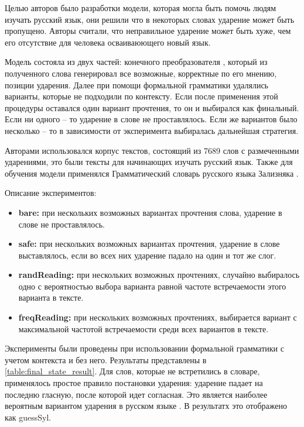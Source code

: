 \documentclass[14pt, a4paper, russian]{report}
\begin{document}
\begin{normalsize}
Целью авторов\cite{reynolds} было разработки модели, которая могла быть помочь людям изучать русский язык, они решили что в некоторых словах ударение может быть пропущено. Авторы считали, что неправильное ударение может быть хуже, чем его отсутствие для человека осваиваюющего новый язык.

Модель состояла из двух частей: конечного преобразователя \cite{koskenniemi, karttunen}, который из полученного слова генерировал все возможные, корректные по его мнению, позиции ударения. Далее при помощи формальной грамматики \cite{karlsson} удалялись варианты, которые не подходили по контексту. Если после применения этой процедуры оставался один вариант прочтения, то он и выбирался как финальный. Если ни одного -- то ударение в слове не проставлялось. Если же вариантов было несколько -- то в зависимости от эксперимента выбиралась дальнейшая стратегия. 

Авторами использовался корпус текстов, состоящий из 7689 слов с размеченными ударениями, это были тексты для начинающих изучать русский язык. Также для обучения модели применялся Грамматический словарь русского языка Зализняка \cite{zaliz}. 

Описание экспериментов:
\begin{itemize}
	\item \textbf{bare:} при нескольких возможных вариантах прочтения  слова, ударение в слове не проставлялось.
	\item \textbf{safe:}  при нескольких возможных вариантах прочтения, ударение в слове выставлялось, если во всех них ударение падало на один и тот же слог.
	\item \textbf{randReading:} при нескольких возможных прочтениях, случайно выбиралось одно с вероятностью выбора варианта равной частоте встречаемости этого варианта в тексте.
	
	\item \textbf{freqReading:} при нескольких возможных прочтениях, выбирается вариант с максимальной  частотой встречаемости среди всех  вариантов в тексте.
\end{itemize}


Эксперименты были проведены при использовании формальной грамматики с учетом контекста и без него. Результаты представлены в \cref{table:final_state_result}. Для слов, которые не встретились в словаре, применялось простое правило постановки ударения: ударение падает на последню гласную, после которой идет согласная. Это является наиболее вероятным вариантом ударения в русском языке \cite{lavitskaya}. В результатх это отображено как guessSyl.


\end{normalsize}
\end{document}
